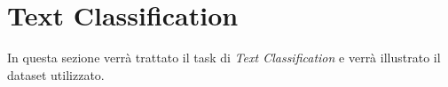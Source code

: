 \section{Text Classification}
In questa sezione verrà trattato il task di \textit{Text Classification} e verrà illustrato il dataset utilizzato. 


